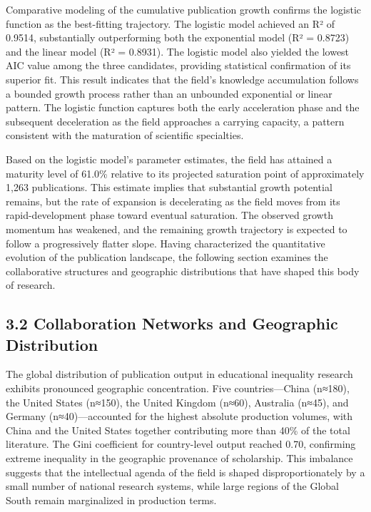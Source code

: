 \documentclass[12pt,a4paper]{article}
\begin{document}
Comparative modeling of the cumulative publication growth confirms the logistic function as the best-fitting trajectory. The logistic model achieved an R² of 0.9514, substantially outperforming both the exponential model (R² = 0.8723) and the linear model (R² = 0.8931). The logistic model also yielded the lowest AIC value among the three candidates, providing statistical confirmation of its superior fit. This result indicates that the field's knowledge accumulation follows a bounded growth process rather than an unbounded exponential or linear pattern. The logistic function captures both the early acceleration phase and the subsequent deceleration as the field approaches a carrying capacity, a pattern consistent with the maturation of scientific specialties.

Based on the logistic model's parameter estimates, the field has attained a maturity level of 61.0\% relative to its projected saturation point of approximately 1,263 publications. This estimate implies that substantial growth potential remains, but the rate of expansion is decelerating as the field moves from its rapid-development phase toward eventual saturation. The observed growth momentum has weakened, and the remaining growth trajectory is expected to follow a progressively flatter slope. Having characterized the quantitative evolution of the publication landscape, the following section examines the collaborative structures and geographic distributions that have shaped this body of research.

\subsection{3.2 Collaboration Networks and Geographic Distribution}

The global distribution of publication output in educational inequality research exhibits pronounced geographic concentration. Five countries—China (n≈180), the United States (n≈150), the United Kingdom (n≈60), Australia (n≈45), and Germany (n≈40)—accounted for the highest absolute production volumes, with China and the United States together contributing more than 40\% of the total literature. The Gini coefficient for country-level output reached 0.70, confirming extreme inequality in the geographic provenance of scholarship. This imbalance suggests that the intellectual agenda of the field is shaped disproportionately by a small number of national research systems, while large regions of the Global South remain marginalized in production terms.
\end{document}
